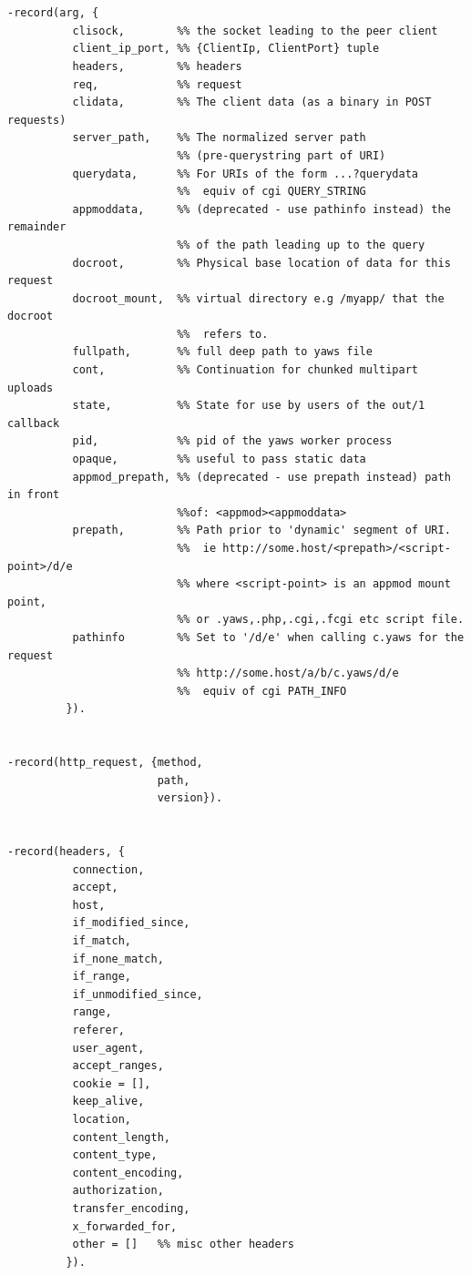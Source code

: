 \documentclass[11pt,oneside,english]{book}
\begin{document}
\begin{verbatim}


-record(arg, {
          clisock,        %% the socket leading to the peer client
          client_ip_port, %% {ClientIp, ClientPort} tuple
          headers,        %% headers
          req,            %% request
          clidata,        %% The client data (as a binary in POST requests)
          server_path,    %% The normalized server path
                          %% (pre-querystring part of URI)
          querydata,      %% For URIs of the form ...?querydata
                          %%  equiv of cgi QUERY_STRING
          appmoddata,     %% (deprecated - use pathinfo instead) the remainder
                          %% of the path leading up to the query
          docroot,        %% Physical base location of data for this request
          docroot_mount,  %% virtual directory e.g /myapp/ that the docroot
                          %%  refers to.
          fullpath,       %% full deep path to yaws file
          cont,           %% Continuation for chunked multipart uploads
          state,          %% State for use by users of the out/1 callback
          pid,            %% pid of the yaws worker process
          opaque,         %% useful to pass static data
          appmod_prepath, %% (deprecated - use prepath instead) path in front
                          %%of: <appmod><appmoddata>
          prepath,        %% Path prior to 'dynamic' segment of URI.
                          %%  ie http://some.host/<prepath>/<script-point>/d/e
                          %% where <script-point> is an appmod mount point,
                          %% or .yaws,.php,.cgi,.fcgi etc script file.
          pathinfo        %% Set to '/d/e' when calling c.yaws for the request
                          %% http://some.host/a/b/c.yaws/d/e
                          %%  equiv of cgi PATH_INFO
         }).


-record(http_request, {method,
                       path,
                       version}).


-record(headers, {
          connection,
          accept,
          host,
          if_modified_since,
          if_match,
          if_none_match,
          if_range,
          if_unmodified_since,
          range,
          referer,
          user_agent,
          accept_ranges,
          cookie = [],
          keep_alive,
          location,
          content_length,
          content_type,
          content_encoding,
          authorization,
          transfer_encoding,
          x_forwarded_for,
          other = []   %% misc other headers
         }).

\end{verbatim}
\end{document}
